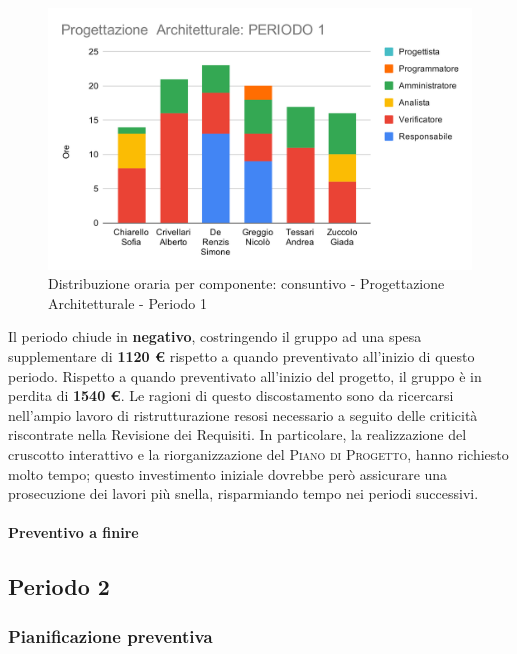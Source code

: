 \begin{figure}[H]
	\centering
	\includegraphics[scale=2]{res/images/charts/consuntivo/prog_arch_1.png}
	\caption{Distribuzione oraria per componente: consuntivo - Progettazione Architetturale - Periodo 1}
\end{figure}
\newpage
Il periodo chiude in \textbf{negativo}, costringendo il gruppo ad una spesa supplementare di \textbf{1120 \euro} rispetto a quando preventivato all'inizio di questo periodo. Rispetto a quando preventivato all'inizio del progetto, il gruppo è in perdita di \textbf{1540 \euro}. Le ragioni di questo discostamento sono da ricercarsi nell'ampio lavoro di ristrutturazione resosi necessario a seguito delle criticità riscontrate nella Revisione dei Requisiti. In particolare, la realizzazione del cruscotto interattivo e la riorganizzazione del \textsc{Piano di Progetto}, hanno richiesto molto tempo; questo investimento iniziale dovrebbe però assicurare una prosecuzione dei lavori più snella, risparmiando tempo nei periodi successivi.

\paragraph{Preventivo a finire}
\subparagraph*{}

\pafTable{
	
}



\pagebreak
\subsection{Periodo 2}

\subsubsection{Pianificazione preventiva}

